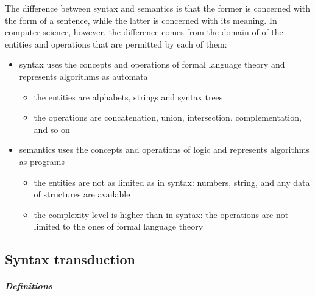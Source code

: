 \documentclass[english]{article}
\begin{document}
\bigskip
The difference between syntax and semantics is that the former is concerned with the form of a sentence, while the latter is concerned with its meaning.
In computer science, however, the difference comes from the domain of of the entities and operations that are permitted by each of them:

\begin{itemize}
  \item syntax uses the concepts and operations of formal language theory and represents algorithms as automata
        \begin{itemize}[label=\(\rightarrow\)]
          \item the entities are alphabets, strings and syntax trees
          \item the operations are concatenation, union, intersection, complementation, and so on
        \end{itemize}
  \item semantics uses the concepts and operations of logic and represents algorithms as programs
        \begin{itemize}[label=\(\rightarrow\)]
          \item the entities are not as limited as in syntax: numbers, string, and any data of structures are available
          \item the complexity level is higher than in syntax: the operations are not limited to the ones of formal language theory
        \end{itemize}
\end{itemize}

\subsection{Syntax transduction}

\subparagraph*{Definitions}
\end{document}
